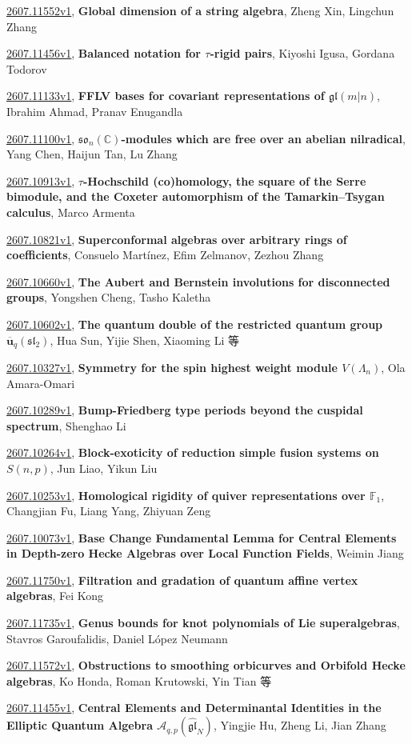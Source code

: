 \documentclass[9pt, a4paper]{article}
\theoremstyle{plain}
\theoremstyle{definition}
\theoremstyle{remark}
\newcommand{\arxiv}[3]{\href{https://arxiv.org/abs/#1}{#1}, \textbf{\textcolor{arxivblue}{#2}}, #3}
\begin{document}
\arxiv{2607.11552v1}{Global dimension of a string algebra}{Zheng Xin, Lingchun Zhang}

\arxiv{2607.11456v1}{Balanced notation for $τ$-rigid pairs}{Kiyoshi Igusa, Gordana Todorov}

\arxiv{2607.11133v1}{FFLV bases for covariant representations of $\mathfrak{gl}(m|n)$}{Ibrahim Ahmad, Pranav Enugandla}

\arxiv{2607.11100v1}{$\mathfrak{so}_n(\mathbb{C})$-modules which are free over an abelian nilradical}{Yang Chen, Haijun Tan, Lu Zhang}

\arxiv{2607.10913v1}{$τ$-Hochschild (co)homology, the square of the Serre bimodule, and the Coxeter automorphism of the Tamarkin--Tsygan calculus}{Marco Armenta}

\arxiv{2607.10821v1}{Superconformal algebras over arbitrary rings of coefficients}{Consuelo Martínez, Efim Zelmanov, Zezhou Zhang}

\arxiv{2607.10660v1}{The Aubert and Bernstein involutions for disconnected groups}{Yongshen Cheng, Tasho Kaletha}

\arxiv{2607.10602v1}{The quantum double of the restricted quantum group $\mathbf{\overline{u}}_q(\mathfrak{sl_2})$}{Hua Sun, Yijie Shen, Xiaoming Li 等}

\arxiv{2607.10327v1}{Symmetry for the spin highest weight module $V(Λ_n)$}{Ola Amara-Omari}

\arxiv{2607.10289v1}{Bump-Friedberg type periods beyond the cuspidal spectrum}{Shenghao Li}

\arxiv{2607.10264v1}{Block-exoticity of reduction simple fusion systems on $S(n,p)$}{Jun Liao, Yikun Liu}

\arxiv{2607.10253v1}{Homological rigidity of quiver representations over $\mathbb{F}_1$}{Changjian Fu, Liang Yang, Zhiyuan Zeng}

\arxiv{2607.10073v1}{Base Change Fundamental Lemma for Central Elements in Depth-zero Hecke Algebras over Local Function Fields}{Weimin Jiang}

\arxiv{2607.11750v1}{Filtration and gradation of quantum affine vertex algebras}{Fei Kong}

\arxiv{2607.11735v1}{Genus bounds for knot polynomials of Lie superalgebras}{Stavros Garoufalidis, Daniel López Neumann}

\arxiv{2607.11572v1}{Obstructions to smoothing orbicurves and Orbifold Hecke algebras}{Ko Honda, Roman Krutowski, Yin Tian 等}

\arxiv{2607.11455v1}{Central Elements and Determinantal Identities in the Elliptic Quantum Algebra \( \mathcal{A}_{q,p}(\widehat{\mathfrak{gl}}_N)\)}{Yingjie Hu, Zheng Li, Jian Zhang}
\end{document}
